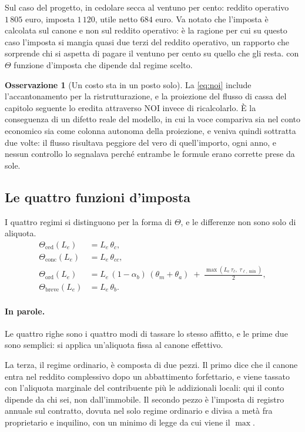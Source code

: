 \documentclass[11pt,a4paper]{article}
\theoremstyle{definition}
\newtheorem{osservazione}[definizione]{Osservazione}
\theoremstyle{plain}
\begin{document}
Sul caso del progetto, in cedolare secca al ventuno per cento: reddito operativo $1\,805$ euro, imposta $1\,120$, utile netto $684$ euro. Va notato che l'imposta è calcolata sul canone e non sul reddito operativo: è la ragione per cui su questo caso l'imposta si mangia quasi due terzi del reddito operativo, un rapporto che sorprende chi si aspetta di pagare il ventuno per cento su quello che gli resta.
con $\Theta$ funzione d'imposta che dipende dal regime scelto.

\begin{osservazione}[Un costo sta in un posto solo]
La \eqref{eq:noi} include l'accantonamento per la ristrutturazione, e la proiezione del flusso di cassa del capitolo seguente lo eredita attraverso $\mathrm{NOI}$ invece di ricalcolarlo. È la conseguenza di un difetto reale del modello, in cui la voce compariva sia nel conto economico sia come colonna autonoma della proiezione, e veniva quindi sottratta due volte: il flusso risultava peggiore del vero di quell'importo, ogni anno, e nessun controllo lo segnalava perché entrambe le formule erano corrette prese da sole.
\end{osservazione}

\subsection{Le quattro funzioni d'imposta}

I quattro regimi si distinguono per la forma di $\Theta$, e le differenze non sono solo di aliquota.
\begin{align}
\Theta_{\text{ced}}(L_e) &= L_e\,\theta_c, \label{eq:ced}\\
\Theta_{\text{conc}}(L_e) &= L_e\,\theta_{cc}, \label{eq:conc}\\
\Theta_{\text{ord}}(L_e) &= L_e\,(1-\alpha_b)\,(\theta_m + \theta_a) \;+\; \frac{\max(L_e\,\tau_\ell,\;\tau_{\ell,\min})}{2}, \label{eq:ord}\\
\Theta_{\text{breve}}(L_e) &= L_e\,\theta_b. \label{eq:breve}
\end{align}

\paragraph{In parole.} Le quattro righe sono i quattro modi di tassare lo stesso affitto, e le prime due sono semplici: si applica un'aliquota fissa al canone effettivo.

La terza, il regime ordinario, è composta di due pezzi. Il primo dice che il canone entra nel reddito complessivo dopo un abbattimento forfettario, e viene tassato con l'aliquota marginale del contribuente più le addizionali locali: qui il conto dipende da chi sei, non dall'immobile. Il secondo pezzo è l'imposta di registro annuale sul contratto, dovuta nel solo regime ordinario e divisa a metà fra proprietario e inquilino, con un minimo di legge da cui viene il $\max$.
\end{document}
